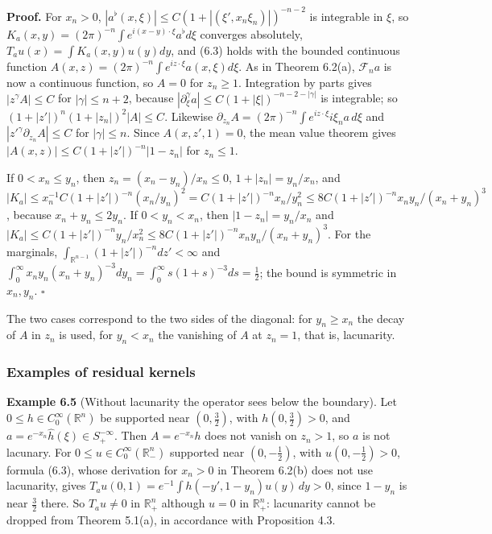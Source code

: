 \documentclass[
  11pt,
]{article}
\begin{document}
\textbf{Proof.} For \(x_n>0\),
\(|a^\flat(x,\xi)|\leq C(1+|(\xi',x_n\xi_n)|)^{-n-2}\) is integrable in
\(\xi\), so \(K_a(x,y)=(2\pi)^{-n}\int e^{i(x-y)\cdot\xi}a^\flat d\xi\)
converges absolutely, \(T_au(x)=\int K_a(x,y)u(y)dy\), and (6.3) holds
with the bounded continuous function
\(A(x,z)=(2\pi)^{-n}\int e^{iz\cdot\xi}a(x,\xi)d\xi\). As in Theorem
6.2(a), \(\mathcal F_na\) is now a continuous function, so \(A=0\) for
\(z_n\geq1\). Integration by parts gives \(|z^\gamma A|\leq C\) for
\(|\gamma|\leq n+2\), because
\(|\partial_\xi^\gamma a|\leq C(1+|\xi|)^{-n-2-|\gamma|}\) is
integrable; so \((1+|z'|)^n(1+|z_n|)^2|A|\leq C\). Likewise
\(\partial_{z_n}A=(2\pi)^{-n}\int e^{iz\cdot\xi}i\xi_na\,d\xi\) and
\(|z'^\gamma\partial_{z_n}A|\leq C\) for \(|\gamma|\leq n\). Since
\(A(x,z',1)=0\), the mean value theorem gives
\(|A(x,z)|\leq C(1+|z'|)^{-n}|1-z_n|\) for \(z_n\leq1\).

If \(0<x_n\leq y_n\), then \(z_n=(x_n-y_n)/x_n\leq0\),
\(1+|z_n|=y_n/x_n\), and
\(|K_a|\leq x_n^{-1}C(1+|z'|)^{-n}(x_n/y_n)^2=C(1+|z'|)^{-n}x_n/y_n^2\leq8C(1+|z'|)^{-n}x_ny_n/(x_n+y_n)^3\),
because \(x_n+y_n\leq2y_n\). If \(0<y_n<x_n\), then \(|1-z_n|=y_n/x_n\)
and
\(|K_a|\leq C(1+|z'|)^{-n}y_n/x_n^2\leq8C(1+|z'|)^{-n}x_ny_n/(x_n+y_n)^3\).
For the marginals, \(\int_{\mathbb R^{n-1}}(1+|z'|)^{-n}dz'<\infty\) and
\(\int_0^\infty x_ny_n(x_n+y_n)^{-3}dy_n=\int_0^\infty s(1+s)^{-3}ds=\tfrac12\);
the bound is symmetric in \(x_n,y_n\). \(\square\)

The two cases correspond to the two sides of the diagonal: for
\(y_n\geq x_n\) the decay of \(A\) in \(z_n\) is used, for \(y_n<x_n\)
the vanishing of \(A\) at \(z_n=1\), that is, lacunarity.

\subsubsection{Examples of residual
kernels}\label{examples-of-residual-kernels}

\textbf{Example 6.5} (Without lacunarity the operator sees below the
boundary). Let \(0\leq h\in C_0^\infty(\mathbb R^n)\) be supported near
\((0,\tfrac32)\), with \(h(0,\tfrac32)>0\), and
\(a=e^{-x_n}\widehat h(\xi)\in S^{-\infty}_+\). Then \(A=e^{-x_n}h\)
does not vanish on \(z_n>1\), so \(a\) is not lacunary. For
\(0\leq u\in C_0^\infty(\mathbb R^n_-)\) supported near
\((0,-\tfrac12)\), with \(u(0,-\tfrac12)>0\), formula (6.3), whose
derivation for \(x_n>0\) in Theorem 6.2(b) does not use lacunarity,
gives \(T_au(0,1)=e^{-1}\int h(-y',1-y_n)u(y)\,dy>0\), since \(1-y_n\)
is near \(\tfrac32\) there. So \(T_au\neq0\) in \(\mathbb R^n_+\)
although \(u=0\) in \(\mathbb R^n_+\): lacunarity cannot be dropped from
Theorem 5.1(a), in accordance with Proposition 4.3.
\end{document}
